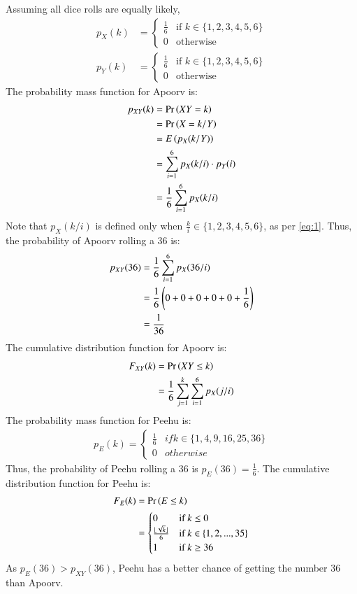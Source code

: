 \documentclass[journal,12pt,twocolumn]{IEEEtran}
\theoremstyle{remark}
\begin{document}
Assuming all dice rolls are equally likely,
\begin{align}
    p_X(k) &= 
    \begin{cases}
        \frac{1}{6} & \text{if }k \in \{1, 2, 3, 4, 5, 6\}\\
        0 & \text{otherwise}
    \end{cases}\label{eq:1}\\
    p_Y(k) &=
    \begin{cases}
        \frac{1}{6} & \text{if }k \in \{1, 2, 3, 4, 5, 6\}\\
        0 & \text{otherwise}
    \end{cases}
\end{align}
The probability mass function for Apoorv is:
\begin{align}
    p_{XY}(k) &= \Pr\left(XY = k\right)\\
    &= \Pr\left(X = k/Y\right)\\
    &= E\left(p_X(k/Y)\right)\\
    &= \sum_{i = 1}^{6} p_X(k/i) \cdot p_Y(i)\\
    &= \frac{1}{6} \sum_{i = 1}^{6} p_X(k/i)
\end{align}
Note that $p_X(k/i)$ is defined only when $\frac{k}{i} \in \{1, 2, 3, 4, 5, 6\}$, as per \eqref{eq:1}.
Thus, the probability of Apoorv rolling a 36 is:
\begin{align}
    p_{XY}(36) &= \frac{1}{6} \sum_{i = 1}^{6} p_X(36/i)\\
    &= \frac{1}{6}\left(0 + 0 + 0 + 0 + 0 + \frac{1}{6}\right)\\
    &= \frac{1}{36}
\end{align}
The cumulative distribution function for Apoorv is:
\begin{align}
    F_{XY}(k) &= \Pr\left(XY \leq k\right)\\
    &= \frac{1}{6} \sum_{j = 1}^{k} \sum_{i = 1}^{6} p_X(j/i)
\end{align}
The probability mass function for Peehu is:
\begin{align}
   p_E(k) = 
   \begin{cases}
        \frac{1}{6} & if k \in \{1, 4, 9, 16, 25, 36\}\\
        0 & otherwise
    \end{cases}
\end{align}
Thus, the probability of Peehu rolling a 36 is $p_E(36) = \frac{1}{6}$.
The cumulative distribution function for Peehu is:
\begin{align}
    F_E(k) &= \Pr\left(E \leq k\right)\\
    &= 
    \begin{cases}
        0 & \text{if }k \leq 0\\
        \frac{\lfloor\sqrt{k}\rfloor}{6} & \text{if }k \in \{1, 2, ..., 35\}\\
        1 & \text{if }k \geq 36
    \end{cases}
\end{align}
As $p_{E}(36) > p_{XY}(36)$, Peehu has a better chance of getting the number 36 than Apoorv.
\end{document}
